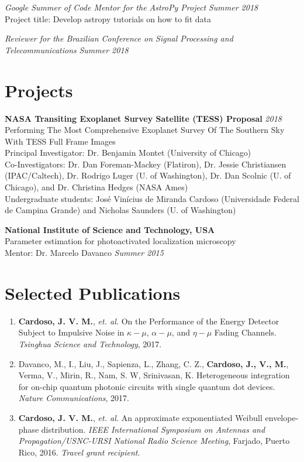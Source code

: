 \documentclass[10pt]{article}
\begin{document}
\begin{titlepage}
\emph{Google Summer of Code Mentor for the AstroPy Project} \hfill \textit{Summer 2018}
\\Project title: Develop astropy tutorials on how to fit data
\vspace{.5cm}

\emph{Reviewer for the Brazilian Conference on Signal Processing and Telecommunications} \hfill \textit{Summer 2018}

\section*{Projects}
    \textbf{NASA Transiting Exoplanet Survey Satellite (TESS) Proposal}
    \hfill \textit{2018}\\
    Performing The Most Comprehensive Exoplanet Survey Of The Southern Sky With TESS Full Frame Images\\
    {\small Principal Investigator: Dr. Benjamin Montet (University of Chicago)}\\
    {\small Co-Investigators: Dr. Dan Foreman-Mackey (Flatiron), Dr. Jessie Christiansen (IPAC/Caltech),
    Dr. Rodrigo Luger (U. of Washington), Dr. Dan Scolnic (U. of Chicago), and Dr. Christina Hedges (NASA Ames)}\\
    {\small Undergraduate students: Jos\'e Vin\'icius de Miranda Cardoso (Universidade Federal de Campina Grande) and
    Nicholas Saunders (U. of Washington)}
    \vspace{.5cm}

    \textbf{National Institute of Science and Technology, USA}\\
    Parameter estimation for photoactivated localization microscopy\\
    {\small Mentor: Dr. Marcelo Davanco}
    \hfill \textit{Summer 2015}
    \vspace{.5cm}

\section*{Selected Publications}
\begin{enumerate}
\item \textbf{Cardoso, J. V. M.}, \textit{et. al.} On the Performance of the Energy Detector Subject to Impulsive
Noise in $\kappa - \mu$, $\alpha - \mu$, and $\eta - \mu$ Fading Channels. \textit{Tsinghua Science and Technology}, 2017.
\item Davanco, M., I., Liu, J., Sapienza, L., Zhang, C. Z., \textbf{Cardoso, J., V., M.}, Verma, V., Mirin, R., Nam,
S. W, Srinivasan, K. Heterogeneous integration for on-chip quantum photonic circuits with single quantum dot devices.
\textit{Nature Communications}, 2017.
\item \textbf{Cardoso, J. V. M.}, \textit{et. al.} An approximate exponentiated Weibull envelope-phase distribution.
\textit{IEEE International Symposium on Antennas and Propagation/USNC-URSI National Radio Science Meeting}, Farjado, Puerto Rico, 2016.
\textit{Travel grant recipient}.
\end{enumerate}


\end{titlepage}
\end{document}
